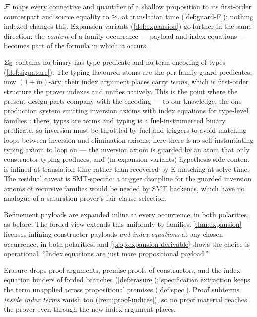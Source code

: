 \begin{description}[leftmargin=2em]
\item[S1 (Native logical structure).]  $\mathcal{F}$ maps every connective and
  quantifier of a shallow proposition to its first-order counterpart and
  source equality to $\approx$, at translation time (\cref{def:guard-F});
  nothing indexed changes this.  Expansion variants
  (\cref{def:expansion}) go further in the same direction: the
  \emph{content} of a family occurrence --- payload and index equations
  --- becomes part of the formula in which it occurs.

\item[S2 (No inhabitation predicate).]  $\Sigma_{\mathbb{E}}$ contains no binary
  has-type predicate and no term encoding of types
  (\cref{def:signature}).  The typing-flavoured atoms are the
  per-family guard predicates, now $(1{+}m)$-ary; their index argument
  places carry \emph{terms}, which is first-order structure the prover
  indexes and unifies natively.  This is the point where the present
  design parts company with the \fstar{} encoding --- to our
  knowledge, the one production system emitting inversion axioms with
  index equations for type-level families \cite{FStarBook,Aguirre2016}: there, types are terms and
  typing is a fuel-instrumented binary predicate, so inversion must be
  throttled by fuel and triggers to avoid matching loops between
  inversion and elimination axioms; here there is no self-instantiating
  typing axiom to loop on --- the inversion axiom is guarded by an atom
  that only constructor typing produces, and (in expansion variants)
  hypothesis-side content is inlined at translation time rather than
  recovered by E-matching at solve time.  The residual caveat is
  SMT-specific: a trigger discipline for the guarded inversion axioms
  of recursive families would be needed by SMT backends, which have no
  analogue of a saturation prover's fair clause selection.

\item[S3 (Per-occurrence payload expansion).]  Refinement payloads are
  expanded inline at every occurrence, in both polarities, as before.
  The forded view extends this uniformly to families:
  \cref{thm:expansion} licenses inlining constructor payloads
  \emph{and index equations} at any chosen occurrence, in both
  polarities, and \cref{prop:expansion-derivable} shows the choice is
  operational.  ``Index equations are just more propositional
  payload.''

\item[S4 (Proofs never become terms).]  Erasure drops proof arguments,
  premise proofs of constructors, and the index-equation binders of
  forded branches (\cref{def:erasure}); specification extraction keeps
  the term unapplied across propositional premises
  (\cref{def:spec}).  Proof subterms \emph{inside index terms} vanish
  too (\cref{rem:proof-indices}), so no proof material reaches the
  prover even through the new index argument places.


\end{description}
